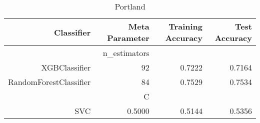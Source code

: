 
\begin{table}[H]
    \caption{Portland}
    \centering
    \begin{tabular}{|r|r|r|r|}
        \hline
        Classifier &Meta Parameter &Training Accuracy
        &Test Accuracy\\
        \hline
        &n\_estimators &\multicolumn{2}{|r|}{}\\
        \hline
        XGBClassifier &92 &0.7222 &0.7164\\
        \hline
        RandomForestClassifier &84 &0.7529 &0.7534\\
        \hline
        &C &\multicolumn{2}{|r|}{}\\
        \hline
        SVC &0.5000 &0.5144 &0.5356\\
        \hline
    \end{tabular}
\end{table}
